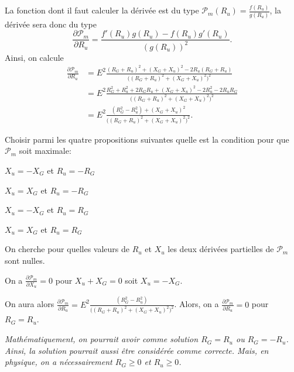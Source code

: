 
\begin{corrige}
La fonction dont il faut calculer la dérivée est du type \(\mathcal{P}_m(R_u)=\frac{f(R_u)}{g(R_u)}\), la dérivée sera donc du type 
\[
\frac{\partial \mathcal{P}_m}{\partial R_u} = \frac{f'(R_u)g(R_u)-f(R_u)g'(R_u)}{(g(R_u))^2}.
\]
 Ainsi, on calcule
\begin{align*}
\frac{\partial \mathcal{P}_m}{\partial R_u}& =  E^2\frac{(R_G+R_u)^2+(X_G+X_u)^2-2R_u(R_G+R_u)}{\Big((R_G+R_u)^2+(X_G+X_u)^2\Big)^2}\\
 & =  E^2\frac{R_G^2+R_u^2+2R_GR_u+(X_G+X_u)^2-2R_u^2-2R_uR_G}{\Big((R_G+R_u)^2+(X_G+X_u)^2\Big)^2}\\
   & =  E^2\frac{(R_G^2-R_u^2)+(X_G+X_u)^2}{\Big((R_G+R_u)^2+(X_G+X_u)^2\Big)^2}.
\end{align*}
\end{corrige}




\begin{enonce}
Choisir parmi les quatre propositions suivantes quelle est la condition pour que $\mathcal{P}_m$ soit maximale:
	\begin{listeQCM2Colonnes}
	\item $X_u=-X_G$ et $R_u=-R_G$
	\item $X_u=X_G$ et $R_u=-R_G$
	\item $X_u=-X_G$ et $R_u=R_G$
	\item $X_u=X_G$ et $R_u=R_G$
	\end{listeQCM2Colonnes}

\end{enonce}

\reponse{\reponseC{}}

\begin{corrige}
On cherche pour quelles valeurs de $R_u$ et $X_u$ les deux dérivées partielles de $\mathcal{P}_m$ sont nulles.

On a $\frac{\partial \mathcal{P}_m}{\partial X_u}=0$ pour $X_u+X_G=0$ soit $X_u=-X_G$.

On aura alors $\frac{\partial \mathcal{P}_m}{\partial R_u}=E^2\frac{(R_G^2-R_u^2)}{\Big((R_G+R_u)^2+(X_G+X_u)^2\Big)^2}$. Alors, on a  $\frac{\partial \mathcal{P}_m}{\partial R_u}=0$ pour $R_G=R_u$.

{\itshape Mathématiquement, on pourrait avoir comme solution $R_G=R_u$ ou $R_G=-R_u$. Ainsi, la solution \reponseA{} pourrait  aussi être considérée comme correcte. Mais, en physique, on a nécessairement $R_G\geq 0$ et $R_u\geq 0$.}
\end{corrige}

